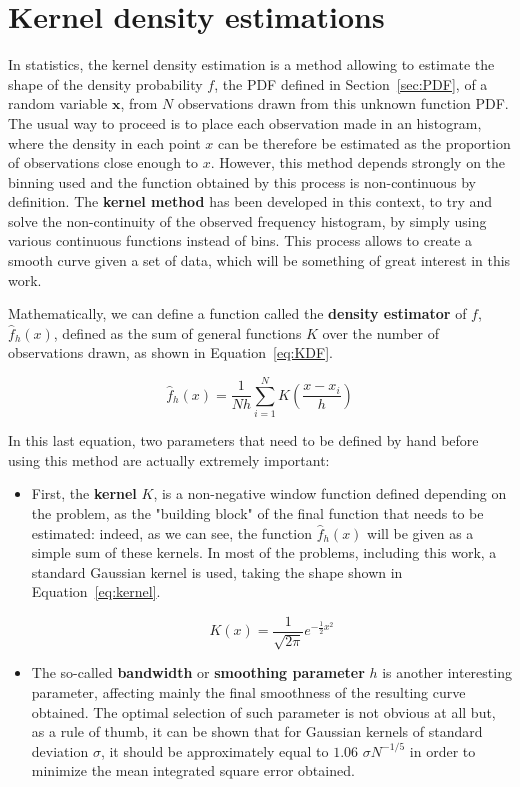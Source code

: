 \documentclass[a4paper, 11pt, twoside, openright]{report}
\begin{document}
\section{Kernel density estimations} \label{sec:KDF}

In statistics, the kernel density estimation is a method allowing to estimate the shape of the density probability $f$, the PDF defined in Section~\ref{sec:PDF}, of a random variable $\bm x$, from $N$ observations drawn from this unknown function PDF. The usual way to proceed is to place each observation made in an histogram, where the density in each point $x$ can be therefore be estimated as the proportion of observations close enough to $x$. However, this method depends strongly on the binning used and the function obtained by this process is non-continuous by definition. The \textbf{kernel method} has been developed in this context, to try and solve  the non-continuity of the observed frequency histogram, by simply using various continuous functions instead of bins. This process allows to create a smooth curve given a set of data, which will be something of great interest in this work.

Mathematically, we can define a function called the \textbf{density estimator} of $f$, $\hat{f}_h(x)$, defined as the sum of general functions $K$ over the number of observations drawn, as shown in Equation~\ref{eq:KDF}.

\begin{equation}
\label{eq:KDF}
\hat{f}_h(x) = \frac{1}{Nh} \sum_{i=1}^{N} K \left (\frac{x-x_i}{h} \right )
\end{equation}

In this last equation, two parameters that need to be defined by hand before using this method are actually extremely important:
\begin{itemize}
\item First, the \textbf{kernel} $K$, is a non-negative window function defined depending on the problem, as the "building block" of the final function that needs to be estimated: indeed, as we can see, the function $\hat{f}_h(x)$ will be given as a simple sum of these kernels. In most of the problems, including this work, a standard Gaussian kernel is used, taking the shape shown in Equation~\ref{eq:kernel}.

\begin{equation}
\label{eq:kernel}
K(x) = \frac{1}{\sqrt{2 \pi}} e^{-\frac{1}{2} x^2}
\end{equation}

\item The so-called \textbf{bandwidth} or \textbf{smoothing parameter} $h$ is another interesting parameter, affecting mainly the final smoothness of the resulting curve obtained. The optimal selection of such parameter is not obvious at all \cite{bandwidth} but, as a rule of thumb, it can be shown that for Gaussian kernels of standard deviation $\sigma$, it should be approximately equal to $1.06$ $\sigma N^{-1/5}$ in order to minimize the mean integrated square error obtained. 
\end{itemize}
\end{document}
